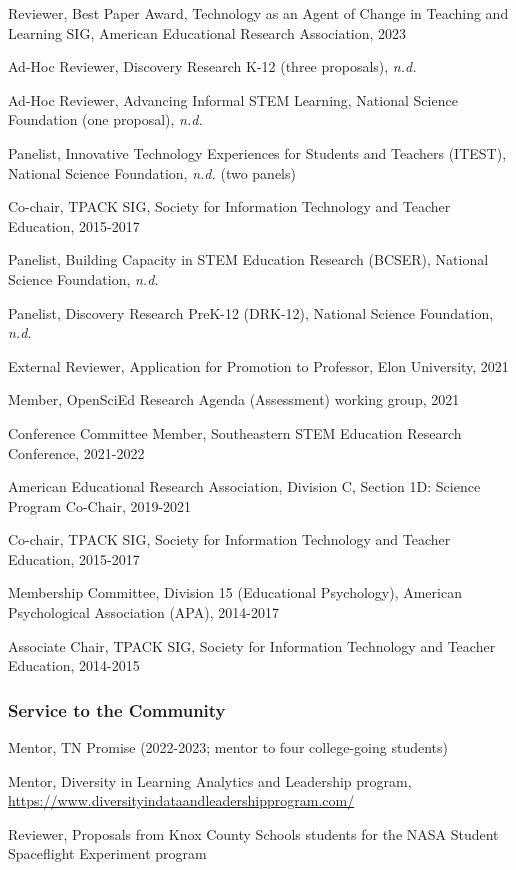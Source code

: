 \documentclass[
  14,
]{article}
\begin{document}
Reviewer, Best Paper Award, Technology as an Agent of Change in Teaching
and Learning SIG, American Educational Research Association, 2023

Ad-Hoc Reviewer, Discovery Research K-12 (three proposals), \emph{n.d.}

Ad-Hoc Reviewer, Advancing Informal STEM Learning, National Science
Foundation (one proposal), \emph{n.d.}

Panelist, Innovative Technology Experiences for Students and Teachers
(ITEST), National Science Foundation, \emph{n.d.} (two panels)

Co-chair, TPACK SIG, Society for Information Technology and Teacher
Education, 2015-2017

Panelist, Building Capacity in STEM Education Research (BCSER), National
Science Foundation, \emph{n.d.}

Panelist, Discovery Research PreK-12 (DRK-12), National Science
Foundation, \emph{n.d.}

External Reviewer, Application for Promotion to Professor, Elon
University, 2021

Member, OpenSciEd Research Agenda (Assessment) working group, 2021

Conference Committee Member, Southeastern STEM Education Research
Conference, 2021-2022

American Educational Research Association, Division C, Section 1D:
Science Program Co-Chair, 2019-2021

Co-chair, TPACK SIG, Society for Information Technology and Teacher
Education, 2015-2017

Membership Committee, Division 15 (Educational Psychology), American
Psychological Association (APA), 2014-2017

Associate Chair, TPACK SIG, Society for Information Technology and
Teacher Education, 2014-2015

\hypertarget{service-to-the-community}{%
\subsubsection{Service to the
Community}\label{service-to-the-community}}

Mentor, TN Promise (2022-2023; mentor to four college-going students)

Mentor, Diversity in Learning Analytics and Leadership program,
\url{https://www.diversityindataandleadershipprogram.com/}

Reviewer, Proposals from Knox County Schools students for the NASA
Student Spaceflight Experiment program
\end{document}
